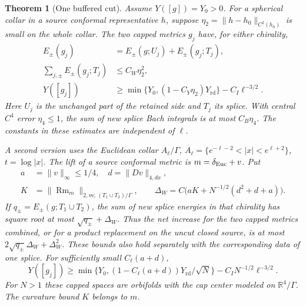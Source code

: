 \documentclass[11pt]{article}
\numberwithin{equation}{section}
\newtheorem{theorem}{Theorem}[section]
\theoremstyle{definition}
\theoremstyle{remark}
\newcommand{\Rm}{\operatorname{Rm}}
\newcommand{\R}{\mathbb R}
\newcommand{\Yrd}{Y_{\mathrm{rd}}}
\begin{document}
\begin{theorem}[One buffered cut]\label{thm:caps}
Assume \(Y([g])=Y_0>0\). For a spherical collar in a source
conformal representative \(h\), suppose \(\eta_2=\|h-h_0\|_{C^2(h_0)}\)
is small on the whole collar. The two capped metrics \(g_j\)
have, for either chirality,
\begin{align}
 E_\pm(g_j)&=E_\pm(g;U_j)+E_\pm(g_j;T_j),\\
 \sum_{j,\pm} E_\pm(g_j;T_j)&\le C_W\eta_2^2,\\
 Y([g_j])&\ge\min\{Y_0,(1-C_Y\eta_2)\Yrd\}- C_I\ell^{-3/2}.
 \label{eq:smoothcap}
\end{align}
Here \(U_j\) is the unchanged part of the retained side and
\(T_j\) its splice. With central \(C^4\) error \(\eta_4\le1\), the
sum of new splice Bach integrals is at most \(C_B\eta_4\).
The constants in these estimates are independent of \(\ell\).

A second version uses the Euclidean collar
\(A_\ell/\Gamma\), \(A_\ell=\{e^{-\ell-2}<|x|<e^{\ell+2}\}\),
\(t=\log|x|\). The lift of a source conformal metric is
\(m=\delta_{\rm Euc}+v\). Put
\begin{align*}
 a&=\|v\|_\infty\le 1/4,\quad d=\|Dv\|_{4,dx},\\
 K&=\|\Rm_m\|_{2,m;\,(T_1\cup T_2)/\Gamma},\qquad
 \Delta_W=C\big(aK+N^{-1/2}(d^2+d+a)\big).
\end{align*}
If \(q_\pm=E_\pm(g;T_1\cup T_2)\), the sum of new splice
energies in that chirality has square root at most
\(\sqrt{q_\pm}+\Delta_W\). Thus the net increase for the two
capped metrics combined, or for a product replacement on the
uncut closed source, is at most \(2\sqrt{q_\pm}\Delta_W+\Delta_W^2\).
These bounds also hold separately with the corresponding data of
one splice. For sufficiently small \(C_\ell(a+d)\),
\begin{equation}\label{eq:weakcap}
 Y([g_j])\ge
 \min\{Y_0,(1-C_\ell(a+d))\Yrd/\sqrt N\}
       -C_I N^{-1/2}\ell^{-3/2}.
\end{equation}
For \(N>1\) these capped spaces are orbifolds with the cap center
modeled on \(\R^4/\Gamma\). The curvature bound \(K\) belongs to \(m\).
\end{theorem}
\end{document}
